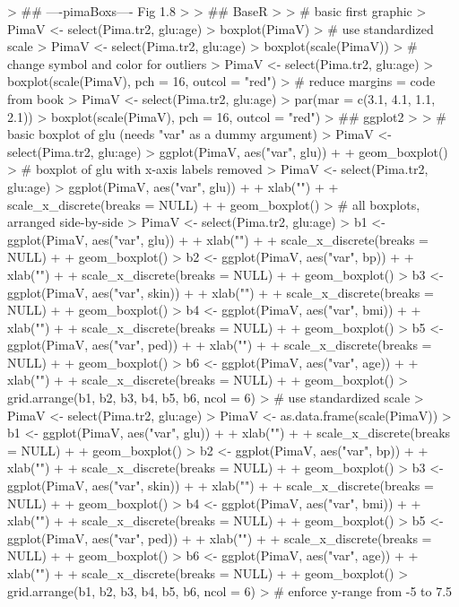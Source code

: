 \documentclass[12pt,letterpaper,final]{article}
\begin{document}
\begin{Schunk}
\begin{Sinput}
> ## ----pimaBoxs---- Fig 1.8
> 
> ## BaseR
> 
> # basic first graphic
> PimaV <- select(Pima.tr2, glu:age)
> boxplot(PimaV)
> # use standardized scale
> PimaV <- select(Pima.tr2, glu:age)
> boxplot(scale(PimaV))
> # change symbol and color for outliers
> PimaV <- select(Pima.tr2, glu:age)
> boxplot(scale(PimaV), pch = 16, outcol = "red")
> # reduce margins = code from book
> PimaV <- select(Pima.tr2, glu:age)
> par(mar = c(3.1, 4.1, 1.1, 2.1))
> boxplot(scale(PimaV), pch = 16, outcol = "red")
> ## ggplot2
> 
> # basic boxplot of glu (needs "var" as a dummy argument)
> PimaV <- select(Pima.tr2, glu:age)
> ggplot(PimaV, aes("var", glu)) +
+   geom_boxplot()
> # boxplot of glu with x-axis labels removed
> PimaV <- select(Pima.tr2, glu:age)
> ggplot(PimaV, aes("var", glu)) +
+   xlab("") +
+   scale_x_discrete(breaks = NULL) +
+   geom_boxplot()
> # all boxplots, arranged side-by-side
> PimaV <- select(Pima.tr2, glu:age)
> b1 <- ggplot(PimaV, aes("var", glu)) +
+   xlab("") +
+   scale_x_discrete(breaks = NULL) +
+   geom_boxplot()
> b2 <- ggplot(PimaV, aes("var", bp)) +
+   xlab("") +
+   scale_x_discrete(breaks = NULL) +
+   geom_boxplot()
> b3 <- ggplot(PimaV, aes("var", skin)) +
+   xlab("") +
+   scale_x_discrete(breaks = NULL) +
+   geom_boxplot()
> b4 <- ggplot(PimaV, aes("var", bmi)) +
+   xlab("") +
+   scale_x_discrete(breaks = NULL) +
+   geom_boxplot()
> b5 <- ggplot(PimaV, aes("var", ped)) +
+   xlab("") +
+   scale_x_discrete(breaks = NULL) +
+   geom_boxplot()
> b6 <- ggplot(PimaV, aes("var", age)) +
+   xlab("") +
+   scale_x_discrete(breaks = NULL) +
+   geom_boxplot()
> grid.arrange(b1, b2, b3, b4, b5, b6, ncol = 6)
> # use standardized scale
> PimaV <- select(Pima.tr2, glu:age)
> PimaV <- as.data.frame(scale(PimaV))
> b1 <- ggplot(PimaV, aes("var", glu)) +
+   xlab("") +
+   scale_x_discrete(breaks = NULL) +
+   geom_boxplot()
> b2 <- ggplot(PimaV, aes("var", bp)) +
+   xlab("") +
+   scale_x_discrete(breaks = NULL) +
+   geom_boxplot()
> b3 <- ggplot(PimaV, aes("var", skin)) +
+   xlab("") +
+   scale_x_discrete(breaks = NULL) +
+   geom_boxplot()
> b4 <- ggplot(PimaV, aes("var", bmi)) +
+   xlab("") +
+   scale_x_discrete(breaks = NULL) +
+   geom_boxplot()
> b5 <- ggplot(PimaV, aes("var", ped)) +
+   xlab("") +
+   scale_x_discrete(breaks = NULL) +
+   geom_boxplot()
> b6 <- ggplot(PimaV, aes("var", age)) +
+   xlab("") +
+   scale_x_discrete(breaks = NULL) +
+   geom_boxplot()
> grid.arrange(b1, b2, b3, b4, b5, b6, ncol = 6)
> # enforce y-range from -5 to 7.5

\end{Sinput}
\end{Schunk}
\end{document}
